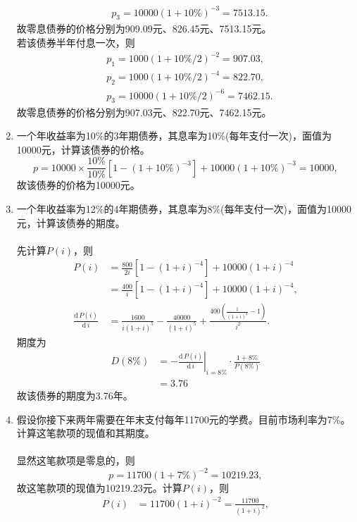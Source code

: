 \begin{enumerate}
\begin{align*}
        & p_3 = 10000(1 + 10\%)^{-3} = 7513.15.
    \end{align*}
    故零息债券的价格分别为909.09元、826.45元、7513.15元。\\
    若该债券半年付息一次，则
    \begin{align*}
        & p_1 = 1000(1 + 10\%/2)^{-2} = 907.03,\\
        & p_2 = 1000(1 + 10\%/2)^{-4} = 822.70,\\
        & p_3 = 10000(1 + 10\%/2)^{-6} = 7462.15.
    \end{align*}
    故零息债券的价格分别为907.03元、822.70元、7462.15元。
    \item 一个年收益率为10\%的3年期债券，其息率为10\%(每年支付一次)，面值为10000元，计算该债券的价格。\\
    \sol
    \[p = 10000 \times \frac{10\%}{10\%} [1 - (1 + 10\%)^{-3}] + 10000(1 + 10\%)^{-3} = 10000,\]
    故该债券的价格为10000元。
    \item 一个年收益率为12\%的4年期债券，其息率为8\%(每年支付一次)，面值为10000元，计算该债券的期度。\\
    \sol\\
    先计算$P(i)$，则
    \begin{align*}
        P(i) & = \frac{800}{2i} \left[1-\left(1 + i\right)^{-4}\right] + 10000(1 + i)^{-4}\\
        & = \frac{400}{i}\left[1-\left(1 + i\right)^{-4}\right] + 10000(1 + i)^{-4},\\
        \frac{\mathrm{d}\, P(i)}{\mathrm{d} \, i} & = \frac{1600}{i(1+i)^5} - \frac{40000}{(1 + i)^5} + \frac{400\left(\frac{1}{(1 + i)^4} - 1\right)}{i^2}.
    \end{align*}
    期度为
    \begin{align*}
        D(8\%) & = \left.-\frac{\mathrm{d}\, P(i)}{\mathrm{d} \, i}\right| _{i = 8\%} \cdot \frac{1 + 8\%}{P(8\%)} \\
        & = 3.76
    \end{align*}
    故该债券的期度为3.76年。
    \item 假设你接下来两年需要在年末支付每年11700元的学费。目前市场利率为7\%。计算这笔款项的现值和其期度。\\
    \sol\\
    显然这笔款项是零息的，则
    \[p = 11700(1 + 7\%)^{-2} = 10219.23,\]
    故这笔款项的现值为10219.23元。计算$P(i)$，则
    \begin{align*}
        P(i) & = 11700(1 + i)^{-2} = \frac{11700}{(1 + i)^2},\\

\end{align*}
\end{enumerate}
